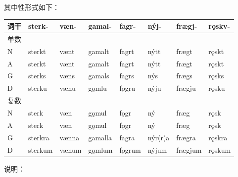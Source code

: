 其中性形式如下：

\begin{longtable}{llllllll}
    \toprule
    词干 & sterk-  & væn-  & gamal-  & fagr-  & nýj-    & frægj-  & rǫskv- \\
    \midrule
    \endhead
    \bottomrule
    \endfoot
    单数 &         &       &         &        &         &         &        \\
    N    & sterkt  & vænt  & gamalt  & fagrt  & nýtt    & frægt   & rǫskt  \\
    A    & sterkt  & vænt  & gamalt  & fagrt  & nýtt    & frægt   & rǫskt  \\
    G    & sterks  & væns  & gamals  & fagrs  & nýs     & frægs   & rǫsks  \\
    D    & sterku  & vænu  & gǫmlu   & fǫgru  & nýju    & frægju  & rǫsku  \\
    复数 &         &       &         &        &         &         &        \\
    N    & sterk   & væn   & gǫmul   & fǫgr   & ný      & fræg    & rǫsk   \\
    A    & sterk   & væn   & gǫmul   & fǫgr   & ný      & fræg    & rǫsk   \\
    G    & sterkra & vænna & gamalla & fagra  & nýr(r)a & frægra  & rǫskra \\
    D    & sterkum & vænum & gǫmlum  & fǫgrum & nýjum   & frægjum & rǫskum \\
\end{longtable}

说明：

